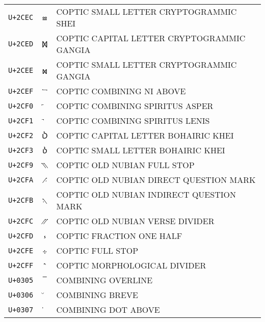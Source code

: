 \documentclass[10pt,a4paper]{article}
\newcommand{\coptic}[1]{{\copticfont #1}}
\newcommand{\diacritic}[1]{{\diacriticfont #1}}
\begin{document}
\begin{longtable}{C C L}
\texttt{U+2CEC} & \coptic{ⳬ} & COPTIC SMALL LETTER CRYPTOGRAMMIC SHEI \\
\texttt{U+2CED} & \coptic{Ⳮ} & COPTIC CAPITAL LETTER CRYPTOGRAMMIC GANGIA \\
\texttt{U+2CEE} & \coptic{ⳮ} & COPTIC SMALL LETTER CRYPTOGRAMMIC GANGIA \\
\texttt{U+2CEF} & \coptic{⳯} & COPTIC COMBINING NI ABOVE \\
\texttt{U+2CF0} & \coptic{⳰} & COPTIC COMBINING SPIRITUS ASPER \\
\texttt{U+2CF1} & \coptic{⳱} & COPTIC COMBINING SPIRITUS LENIS \\
\texttt{U+2CF2} & \coptic{Ⳳ} & COPTIC CAPITAL LETTER BOHAIRIC KHEI \\
\texttt{U+2CF3} & \coptic{ⳳ} & COPTIC SMALL LETTER BOHAIRIC KHEI \\
\texttt{U+2CF9} & \coptic{⳹} & COPTIC OLD NUBIAN FULL STOP \\
\texttt{U+2CFA} & \coptic{⳺} & COPTIC OLD NUBIAN DIRECT QUESTION MARK \\
\texttt{U+2CFB} & \coptic{⳻} & COPTIC OLD NUBIAN INDIRECT QUESTION MARK \\
\texttt{U+2CFC} & \coptic{⳼} & COPTIC OLD NUBIAN VERSE DIVIDER \\
\texttt{U+2CFD} & \coptic{⳽} & COPTIC FRACTION ONE HALF \\
\texttt{U+2CFE} & \coptic{⳾} & COPTIC FULL STOP \\
\texttt{U+2CFF} & \coptic{⳿} & COPTIC MORPHOLOGICAL DIVIDER \\
\texttt{U+0305} & \diacritic{̅} & COMBINING OVERLINE \\
\texttt{U+0306} & \diacritic{̆} & COMBINING BREVE \\
\texttt{U+0307} & \diacritic{̇} & COMBINING DOT ABOVE \\

\bottomrule
\end{longtable}
\end{document}
